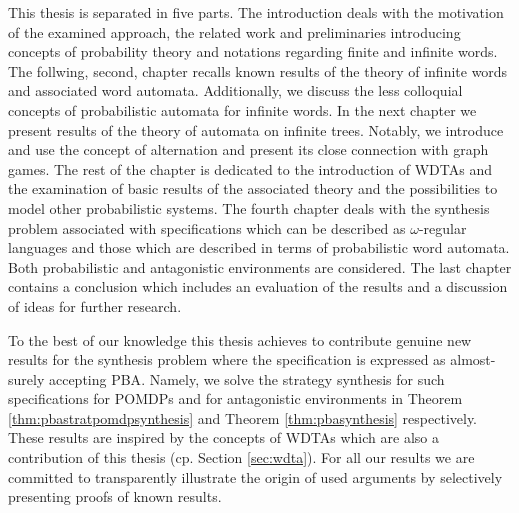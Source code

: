 This thesis is separated in five parts. The introduction deals with the
motivation of the examined approach, the related work and preliminaries
introducing concepts of probability theory and notations regarding finite and
infinite words. The follwing, second, chapter recalls known results of the
theory of infinite words and associated word automata. Additionally, we discuss
the less colloquial concepts of probabilistic automata for infinite words. In
the next chapter we present results of the theory of automata on infinite
trees. Notably, we introduce and use the concept of alternation and present its
close connection with graph games. The rest of the chapter is dedicated to the
introduction of \aclp*{WDTA} and the examination of basic results of the
associated theory and the possibilities to model other probabilistic systems.
The fourth chapter deals with the synthesis problem associated with
specifications which can be described as $\omega$-regular languages and those
which are described in terms of probabilistic word automata. Both probabilistic
and antagonistic environments are considered. The last chapter contains a
conclusion which includes an evaluation of the results and a discussion of
ideas for further research.

To the best of our knowledge this thesis achieves to contribute genuine new
results for the synthesis problem where the specification is expressed as
almost-surely accepting \acl*{PBA}. Namely, we solve the strategy synthesis for
such specifications for \aclp*{POMDP} and for antagonistic environments in
Theorem \ref{thm:pbastratpomdpsynthesis} and Theorem \ref{thm:pbasynthesis}
respectively. These results are inspired by the concepts of \aclp*{WDTA} which
are also a contribution of this thesis (cp. Section \ref{sec:wdta}). For all
our results we are committed to transparently illustrate the origin of used
arguments by selectively presenting proofs of known results.
